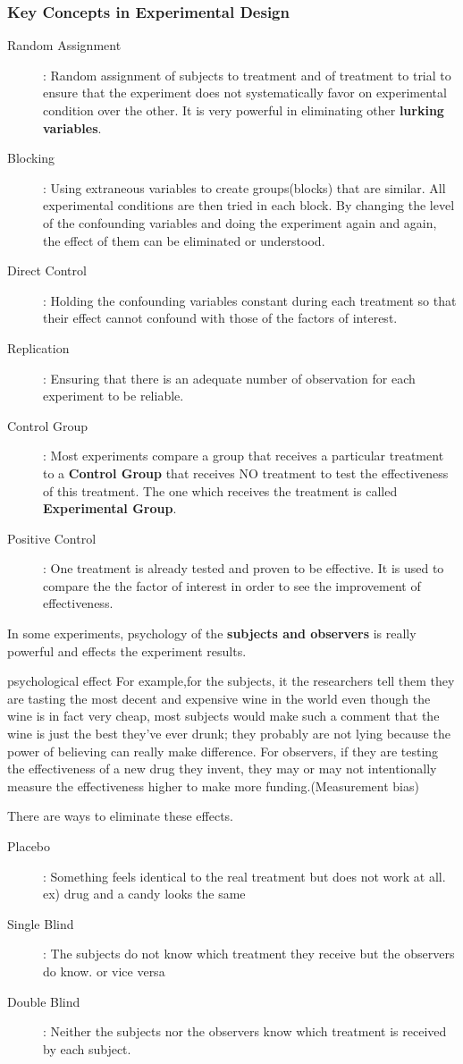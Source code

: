 \subsubsection{Key Concepts in Experimental Design}
\begin{description}
    \item[Random Assignment]: Random assignment of subjects to treatment and of treatment to trial to ensure that the experiment does not systematically favor on experimental condition over the other. It is very powerful in eliminating other \textbf{lurking variables}.
    \item[Blocking]: Using extraneous variables to create groups(blocks) that are similar. All experimental conditions are then tried in each block. By changing the level of the confounding variables and doing  the experiment again and again, the effect of them can be eliminated or understood.
    \item[Direct Control]: Holding the confounding variables constant during each treatment so that their effect cannot confound with those of the factors of interest.
    \item[Replication]: Ensuring that there is an adequate number of observation for each experiment to be reliable.
    \item[Control Group]: Most experiments compare a group that receives a particular treatment to a \textbf{Control Group} that receives NO treatment to test the effectiveness of this treatment. The one which receives the treatment is called \textbf{Experimental Group}.
    \item[Positive Control]: One treatment is already tested and proven to be effective. It is used to compare the the factor of interest in order to see the improvement of effectiveness.
\end{description}
In some experiments, psychology of the \textbf{subjects and observers} is really powerful and effects the experiment results. \\
\begin{examplebox}{psychological effect}
For example,for the subjects, it the researchers tell them they are tasting the most decent and expensive wine in the world even though the wine is in fact very cheap, most subjects would make such a comment that the wine is just the best they've ever drunk; they probably are not lying because the power of believing can really make difference. For observers, if they are testing the effectiveness of a new drug they invent, they may or may not intentionally measure the effectiveness higher to make more funding.(Measurement bias)
\end{examplebox}
\vbox{}
There are ways to eliminate these effects.
\begin{description}
    \item[Placebo]: Something feels identical to the real treatment but does not work at all. ex) drug and a candy looks the same
    \item[Single Blind]: The subjects do not know which treatment they receive but the observers do know. or vice versa
    \item[Double Blind]: Neither the subjects nor the observers know which treatment is received by each subject.
\end{description}
